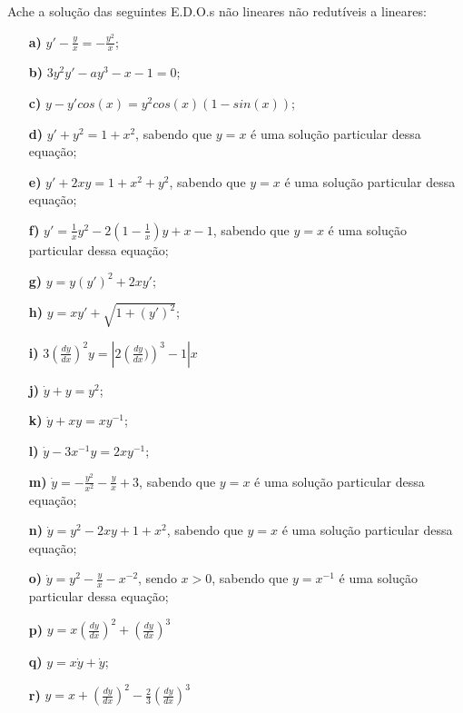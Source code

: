 \linespread{1.5}
Ache a solução das seguintes E.D.O.s não lineares não redutíveis a lineares:
\begin{itemize}
    \item[\textbf{a)}] $y' - \frac{y}{x} = -\frac{y^2}{x}$;
    \item[\textbf{b)}] $3y^2y' - ay^3 - x - 1 = 0$;
    \item[\textbf{c)}] $y-y'cos(x) = y^2cos(x)(1-sin(x))$;
    \item[\textbf{d)}] $y' + y^2 = 1 + x^2$, sabendo que $y=x$ é uma solução particular dessa equação;
    \item[\textbf{e)}] $y' + 2xy = 1 + x^2 + y^2$, sabendo que $y=x$ é uma solução particular dessa equação;
    \item[\textbf{f)}] $y' = \frac{1}{x}y^2 - 2\left(1-\frac{1}{x}\right)y + x - 1$, sabendo que $y=x$ é uma solução particular dessa equação;
    \item[\textbf{g)}] $y = y(y')^2 + 2xy'$;
    \item[\textbf{h)}] $y = xy' + \sqrt{1+(y')^2}$;
    \item[\textbf{i)}] $3\left(\frac{dy}{dx}\right)^2y=\left|2\left(\frac{dy}{dx})\right)^3 - 1 \right|x$
    \item[\textbf{j)}] $\Dot{y} + y = y^2$;
    \item[\textbf{k)}] $\Dot{y} + xy = xy^{-1}$;
    \item[\textbf{l)}] $\Dot{y} - 3x^{-1}y = 2xy^{-1}$;
    \item[\textbf{m)}] $\Dot{y} = -\frac{y^2}{x^2} - \frac{y}{x} + 3$, sabendo que $y=x$ é uma solução particular dessa equação;
    \item[\textbf{n)}] $\Dot{y} = y^2 - 2xy + 1 + x^2$, sabendo que $y=x$ é uma solução particular dessa equação;
    \item[\textbf{o)}] $\Dot{y} = y^2 - \frac{y}{x} - x^{-2}$, sendo $x>0$, sabendo que $y=x^{-1}$ é uma solução particular dessa equação;
    \item[\textbf{p)}] $y = x\left(\frac{dy}{dx}\right)^2 +  \left(\frac{dy}{dx}\right)^3$
    \item[\textbf{q)}] $y = x\Dot{y} + \Dot{y}$;
    \item[\textbf{r)}] $y = x + \left(\frac{dy}{dx}\right)^2 -\frac{2}{3}\left(\frac{dy}{dx}\right)^3$
\end{itemize}